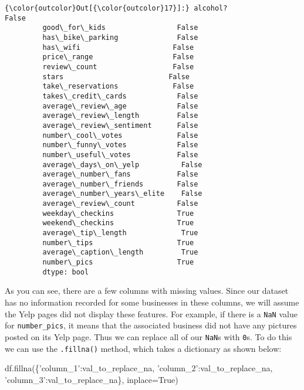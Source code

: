 \documentclass[11pt]{article}
\newenvironment{Shaded}{}{}
\newcommand{\StringTok}[1]{\textcolor[rgb]{0.25,0.44,0.63}{{#1}}}
\newcommand{\NormalTok}[1]{{#1}}
\newcommand{\VariableTok}[1]{\textcolor[rgb]{0.10,0.09,0.49}{{#1}}}
\newcommand{\OperatorTok}[1]{\textcolor[rgb]{0.40,0.40,0.40}{{#1}}}
\begin{document}
\begin{Verbatim}[commandchars=\\\{\}]
{\color{outcolor}Out[{\color{outcolor}17}]:} alcohol?                      False
         good\_for\_kids                 False
         has\_bike\_parking              False
         has\_wifi                      False
         price\_range                   False
         review\_count                  False
         stars                         False
         take\_reservations             False
         takes\_credit\_cards            False
         average\_review\_age            False
         average\_review\_length         False
         average\_review\_sentiment      False
         number\_cool\_votes             False
         number\_funny\_votes            False
         number\_useful\_votes           False
         average\_days\_on\_yelp          False
         average\_number\_fans           False
         average\_number\_friends        False
         average\_number\_years\_elite    False
         average\_review\_count          False
         weekday\_checkins               True
         weekend\_checkins               True
         average\_tip\_length             True
         number\_tips                    True
         average\_caption\_length         True
         number\_pics                    True
         dtype: bool
\end{Verbatim}
            
    As you can see, there are a few columns with missing values. Since our
dataset has no information recorded for some businesses in these
columns, we will assume the Yelp pages did not display these features.
For example, if there is a \texttt{NaN} value for \texttt{number\_pics},
it means that the associated business did not have any pictures posted
on its Yelp page. Thus we can replace all of our \texttt{NaN}s with
\texttt{0}s. To do this we can use the \texttt{.fillna()} method, which
takes a dictionary as shown below:

\begin{Shaded}
\begin{Highlighting}[]
\NormalTok{df.fillna(\{}\StringTok{'column_1'}\NormalTok{:val_to_replace_na,}
           \StringTok{'column_2'}\NormalTok{:val_to_replace_na,}
           \StringTok{'column_3'}\NormalTok{:val_to_replace_na\},}
\NormalTok{          inplace}\OperatorTok{=}\VariableTok{True}\NormalTok{)}
\end{Highlighting}
\end{Shaded}
\end{document}
